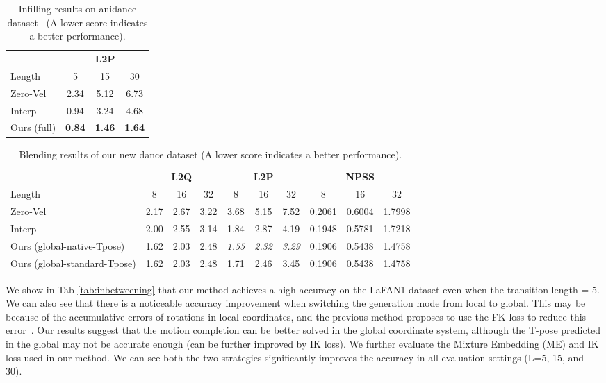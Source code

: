 \documentclass[10pt,twocolumn,letterpaper]{article}
\begin{document}
\begin{table}[ht]
\centering
\caption{Infilling results on anidance dataset~\cite{tang2018anidance} (A lower score indicates a better performance).}
\begin{tabularx}{0.8\linewidth}{l@{\extracolsep{\fill}} ccc}
&\multicolumn{3}{c}{\textbf{L2P}} \\
\cmidrule(lr){2-4}
Length & 5 & 15 & 30 \\
\cmidrule(lr){1-4}
Zero-Vel & 2.34 & 5.12 & 6.73\\
Interp & 0.94 & 3.24 & 4.68 \\
Ours (full)  & \bf{0.84} & \bf{1.46} & \bf{1.64} \\
\bottomrule
\end{tabularx}\label{tab:infilling}
\end{table}

\begin{table*}[ht]
\centering
\caption{Blending results of our new dance dataset (A lower score indicates a better performance).}
\begin{tabularx}{\textwidth}{l@{\extracolsep{\fill}} ccccccccc}
&\multicolumn{3}{c}{\textbf{L2Q}} &\multicolumn{3}{c}{\textbf{L2P}} &\multicolumn{3}{c}{\textbf{NPSS}} \\
\cmidrule(lr){2-4}\cmidrule(lr){5-7}\cmidrule(lr){8-10}
Length & 8 & 16 & 32 & 8 & 16 & 32 & 8 & 16 & 32\\
\cmidrule(lr){1-10}
Zero-Vel & 2.17 & 2.67 & 3.22 & 3.68 & 5.15 & 7.52 & 0.2061 & 0.6004 & 1.7998 \\
Interp & 2.00 & 2.55 & 3.14 & 1.84 & 2.87 & 4.19 & 0.1948 & 0.5781 & 1.7218 \\
\cmidrule(lr){1-10}
Ours (global-native-Tpose)  & 1.62 & 2.03 & 2.48 & \emph{1.55} & \emph{2.32} & \emph{3.29} & 0.1906 & 0.5438 & 1.4758\\
Ours (global-standard-Tpose)  & 1.62 & 2.03 & 2.48 & 1.71 & 2.46 & 3.45 & 0.1906 & 0.5438 & 1.4758 \\
\bottomrule
\end{tabularx}\label{tab:blending}
\end{table*}

We show in Tab \ref{tab:inbetweening} that our method achieves a high accuracy on the LaFAN1 dataset even when the transition length = 5. We can also see that there is a noticeable accuracy improvement when switching the generation mode from local to global. This may be because of the accumulative errors of rotations in local coordinates, and the previous method proposes to use the FK loss to reduce this error~\cite{harvey2020robust}. Our results suggest that the motion completion can be better solved in the global coordinate system, although the T-pose predicted in the global may not be accurate enough (can be further improved by IK loss). We further evaluate the Mixture Embedding (ME) and IK loss used in our method. We can see both the two strategies significantly improves the accuracy in all evaluation settings (L=5, 15, and 30).
\end{document}
